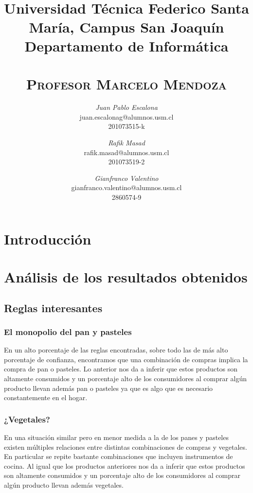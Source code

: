 \documentclass{article}
\title{
  \Large\textmd{\textbf{\tareaRamo\\ \tareaTitulo}}\\
  \vspace{0.1in}
  \normalsize
  Universidad Técnica Federico Santa María, Campus San Joaquín\\
  Departamento de Informática\\
  \vspace{0.1in}
  \small{\textsc{\tareaFecha}}\\
  \vspace{0.1in}
  \large{\textsc{Profesor Marcelo Mendoza}}
  \vspace{1.5in}
}
\author{
    \textit{Juan Pablo Escalona} \\
    \small{juan.escalonag@alumnos.usm.cl} \\
    \small{201073515-k}
    \and
    \textit{Rafik Masad} \\
    \small{rafik.masad@alumnos.usm.cl} \\
    \small{201073519-2}
    \and
    \textit{Gianfranco Valentino}\\
    \small{gianfranco.valentino@alumnos.usm.cl}\\
    \small{2860574-9}
}
\date{}
\begin{document}
\maketitle
\newpage


\section*{Introducción}
\lipsum

\section*{Análisis de los resultados obtenidos}

\subsection*{Reglas interesantes}

\subsubsection*{El monopolio del pan y pasteles}

En un alto porcentaje de las reglas encontradas, sobre todo las de más alto porcentaje de confianza, encontramos que una combinación de compras implica la compra de pan o pasteles. Lo anterior nos da a inferir que estos productos son altamente consumidos y un porcentaje alto de los consumidores al comprar algún producto llevan además pan o pasteles ya que es algo que es necesario constantemente en el hogar.

\subsubsection*{¿Vegetales?}

En una situación similar pero en menor medida a la de los panes y pasteles existen múltiples relaciones entre distintas combinaciones de compras y vegetales. En particular se repite bastante combinaciones que incluyen instrumentos de cocina. Al igual que los productos anteriores nos da a inferir que estos productos son altamente consumidos y un porcentaje alto de los consumidores al comprar algún producto llevan además vegetales.
\end{document}
